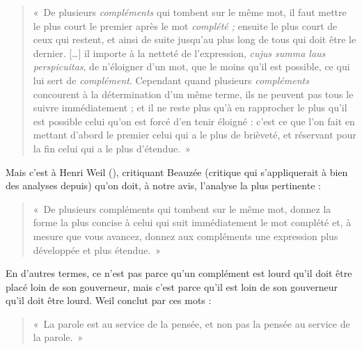 \begin{quote}
    «~De plusieurs \textit{compléments} qui tombent sur le même mot, il faut mettre le plus court le premier après le mot \textit{complété ;} ensuite le plus court de ceux qui restent, et ainsi de suite jusqu’au plus long de tous qui doit être le dernier. […] il importe à la netteté de l’expression, \textit{cujus summa laus perspicuitas}, de n’éloigner d’un mot, que le moins qu’il est possible, ce qui lui sert de \textit{complément}. Cependant quand plusieurs \textit{compléments} concourent à la détermination d’un même terme, ils ne peuvent pas tous le suivre immédiatement ; et il ne reste plus qu’à en rapprocher le plus qu’il est possible celui qu’on est forcé d’en tenir éloigné : c’est ce que l’on fait en mettant d’abord le premier celui qui a le plus de brièveté, et réservant pour la fin celui qui a le plus d’étendue.~»
\end{quote}
Mais c’est à Henri Weil (\citeyear[97--102]{weil1844de}), critiquant Beauzée (critique qui s’appliquerait à bien des analyses depuis) qu’on doit, à notre avis, l’analyse la plus pertinente :

\begin{quote}
    «~De plusieurs compléments qui tombent sur le même mot, donnez la forme la plus concise à celui qui suit immédiatement le mot complété et, à mesure que vous avancez, donnez aux compléments une expression plus développée et plus étendue.~»
\end{quote}
En d’autres termes, ce n’est pas parce qu’un complément est lourd qu’il doit être placé loin de son gouverneur, mais c’est parce qu’il est loin de son gouverneur qu’il doit être lourd. Weil conclut par ces mots :

\begin{quote}
    «~La parole est au service de la pensée, et non pas la pensée au service de la parole.~»
\end{quote}

